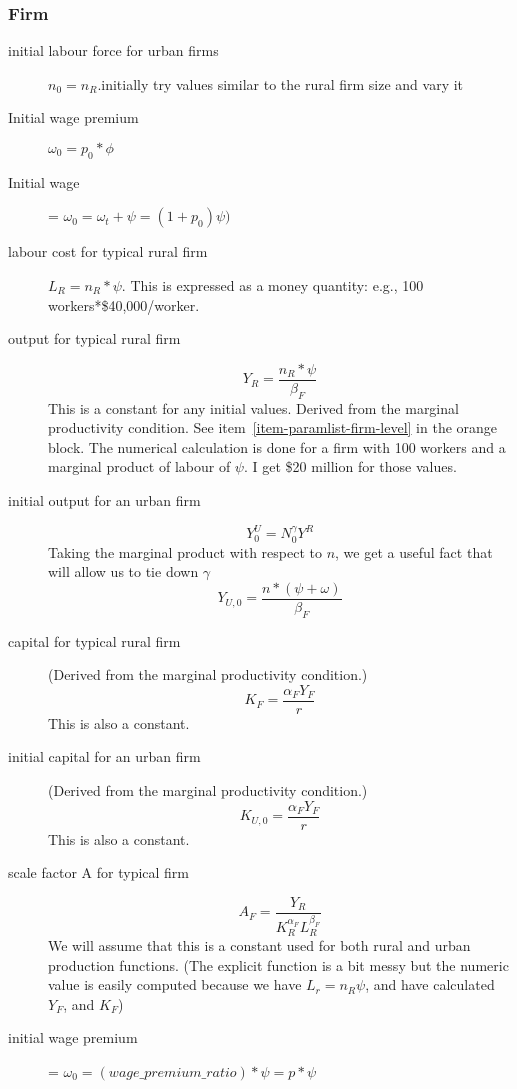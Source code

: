 \subsubsection{Firm}
\begin{description}
\item[initial labour force for urban firms] $n_0=n_R$.initially try values similar to the rural firm size and vary it  %
\item[Initial wage premium] $\omega_0=p_0*\phi$
\item[Initial wage] = $\omega_0=\omega_t +\psi =(1+p_0)\psi)$

\item[labour cost for typical rural firm] $L_R = n_R*\psi$. This is expressed as a money quantity: e.g., 100 workers*\$40,000/worker.  


\item[output for typical rural firm]  
\[Y_R=\frac{n_R*\psi}{\beta_F}\]
This is a constant for any initial values. Derived from the marginal productivity condition. See item~\ref{item-paramlist-firm-level} in the orange  block. The numerical calculation is done  for a firm with 100 workers and a marginal product of labour of $\psi$. I get \$20 million for those values. 


\item[initial output for an urban firm] 
\[Y_0^U=N_0^\gamma Y^R\]  
Taking the marginal product with respect to $n$, we get a useful fact that will allow us to tie down $\gamma$
\[Y_{U,0}=\frac{n*(\psi+\omega)}{\beta_F}\]

\item[capital for typical rural firm] (Derived from the marginal productivity condition.)
\[K_F=  \frac{\alpha_F Y_F }{r}\]
This is also a constant.
 
\item[initial capital for an urban firm] (Derived from the marginal productivity condition.)
\[K_{U,0}=  \frac{\alpha_F Y_F }{r}\]
This is also a constant.

\item[scale factor A for typical  firm] 
\[A_F= \frac{Y_R}{K_R^{\alpha_F} L_R^{\beta_F}}\]
We will assume that this is a constant used for both rural and urban production functions. (The explicit function is a bit  messy but the numeric value is easily computed because we have $L_r=n_R\psi$, and have calculated $Y_F$, and  $K_F$)

\item[initial wage premium] = $\omega_0 = (wage\_premium\_ratio) * \psi = p*\psi $

\end{description}

